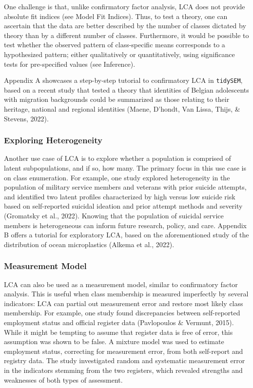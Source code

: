 \documentclass[
  ,man,floatsintext]{apa6}
\begin{document}
One challenge is that, unlike confirmatory factor analysis, LCA does not provide absolute fit indices (see Model Fit Indices).
Thus, to test a theory, one can ascertain that the data are better described by the number of classes dictated by theory than by a different number of classes.
Furthermore, it would be possible to test whether the observed pattern of class-specific means corresponds to a hypothesized pattern;
either qualitatively or quantitatively, using significance tests for pre-specified values (see Inference).

Appendix A showcases a step-by-step tutorial to confirmatory LCA in \texttt{tidySEM},
based on a recent study that tested a theory that identities of Belgian adolescents with migration backgrounds could be summarized as those relating to their heritage, national and regional identities (Maene, D'hondt, Van Lissa, Thijs, \& Stevens, 2022).

\hypertarget{exploring-heterogeneity}{%
\subsubsection{Exploring Heterogeneity}\label{exploring-heterogeneity}}

Another use case of LCA is to explore whether a population is comprised of latent subpopulations, and if so, how many.
The primary focus in this use case is on class enumeration.
For example,
one study explored heterogeneity in the population of military service members and veterans with prior suicide attempts,
and identified two latent profiles characterized by high versus low suicide risk based on self-reported suicidal ideation and prior attempt methods and severity
(Gromatsky et al., 2022).
Knowing that the population of suicidal service members is heterogeneous can inform future research, policy, and care.
Appendix B offers a tutorial for exploratory LCA,
based on the aforementioned study of the distribution of ocean microplastics (Alkema et al., 2022).

\hypertarget{measurement-model}{%
\subsubsection{Measurement Model}\label{measurement-model}}

LCA can also be used as a measurement model, similar to confirmatory factor analysis.
This is useful when class membership is measured imperfectly by several indicators:
LCA can partial out measurement error and restore most likely class membership.
For example, one study found discrepancies between self-reported employment status and official register data (Pavlopoulos \& Vermunt, 2015).
While it might be tempting to assume that register data is free of error, this assumption was shown to be false.
A mixture model was used to estimate employment status, correcting for measurement error, from both self-report and registry data.
The study investigated random and systematic measurement error in the indicators stemming from the two registers,
which revealed strengths and weaknesses of both types of assessment.
\end{document}
